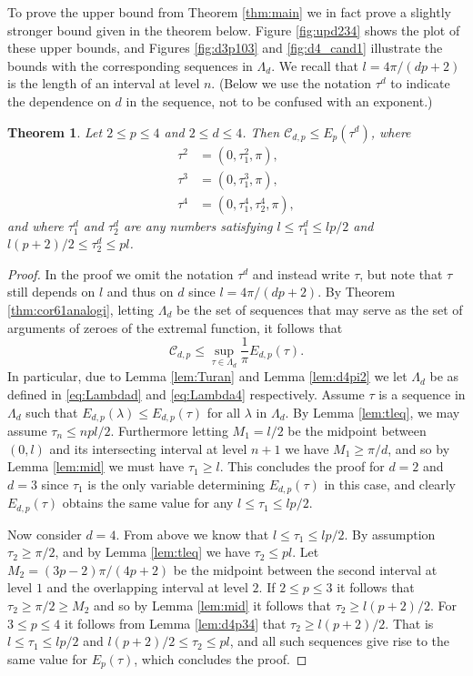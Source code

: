 \documentclass{amsart}
\theoremstyle{plain}
\newtheorem{theorem}{Theorem}
\theoremstyle{remark}
\begin{document}
	To prove the upper bound from Theorem \ref{thm:main} we in fact prove a slightly stronger bound given in the theorem below. Figure \ref{fig:upd234} shows the plot of these upper bounds, and Figures \ref{fig:d3p103} and \ref{fig:d4_cand1} illustrate the bounds with the corresponding sequences in $\Lambda_d$. We recall that $l=4\pi/(dp+2)$ is the length of an interval at level $n$. (Below we use the notation $\tau^d$ to indicate the dependence on $d$ in the sequence, not to be confused with an exponent.)
	\begin{theorem}\label{thm:uppergood}
		Let $2 \leq p \leq 4$ and $2 \leq d \leq 4$. Then $\mathscr{C}_{d,p} \leq E_p(\tau^d)$, where 
		\[\begin{split}
			\tau^2&=(0,\tau_1^2, \pi),\\
			\tau^3&=(0, \tau_1^3, \pi),\\
			\tau^4&=(0, \tau_1^4, \tau_2^4, \pi),
		\end{split}\]
		and where $\tau_1^d$ and $\tau_2^d$ are any numbers satisfying $l \leq \tau_1^d \leq  lp/2$ and $l(p+2)/2 \leq \tau_2^d \leq pl$. 
	\end{theorem}
	
	\begin{proof}
		In the proof we omit the notation $\tau^d$ and instead write $\tau$, but note that $\tau$ still depends on $l$ and thus on $d$ since $l=4 \pi /(dp+2)$. By Theorem \ref{thm:cor61analogi}, letting $\Lambda_d$ be the set of sequences that may serve as the set of arguments of zeroes of the extremal function, it follows that 
		\[\mathscr{C}_{d,p} \leq \sup_{\tau \in \Lambda_d} \frac{1}{\pi} E_{d,p}(\tau).\]
		In particular, due to Lemma \ref{lem:Turan} and Lemma \ref{lem:d4pi2} we let $\Lambda_d$ be as defined in \eqref{eq:Lambdad} and \eqref{eq:Lambda4} respectively. Assume $\tau$ is a sequence in $\Lambda_d$ such that $E_{d,p}(\lambda) \leq E_{d,p}(\tau)$ for all $\lambda$ in $\Lambda_d$. By Lemma \ref{lem:tleq}, we may assume $\tau_n \leq npl/2$. Furthermore letting $M_1=l/2$ be the midpoint between $(0, l)$ and its intersecting interval at level $n+1$ we have $M_1 \geq \pi/d$, and so by Lemma \ref{lem:mid} we must have $\tau_1 \geq l$. This concludes the proof for $d=2$ and $d=3$ since $\tau_1$ is the only variable determining $E_{d,p}(\tau)$ in this case, and clearly $E_{d,p}(\tau)$ obtains the same value for any $l \leq \tau_1 \leq lp/2$. 
		
		Now consider $d=4$. From above we know that $l \leq \tau_1 \leq lp/2$. By assumption $\tau_2 \geq \pi/2$, and by Lemma \ref{lem:tleq} we have $\tau_2 \leq pl$. Let $M_2=(3p-2)\pi/(4p+2)$ be the midpoint between the second interval at level $1$ and the overlapping interval at level $2$. If $2 \leq p \leq 3$ it follows that $\tau_2 \geq \pi/2 \geq M_2$ and so by Lemma \ref{lem:mid} it follows that $\tau_2 \geq l(p+2)/2$. For $3 \leq p \leq 4$ it follows from Lemma \ref{lem:d4p34} that $ \tau_2 \geq l(p+2)/2$. That is $l \leq \tau_1 \leq lp/2$ and $l(p+2)/2 \leq \tau_2 \leq pl$, and all such sequences give rise to the same value for $E_p(\tau)$, which concludes the proof.
	\end{proof}
	
\end{document}

